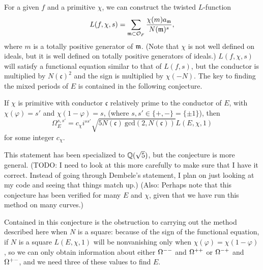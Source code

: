 \documentclass{amsart}
\newcommand{\fc}{\mathfrak{c}}
\newcommand{\OF}{\cO_F}
\begin{document}
For a given $f$ and a primitive $\chi$, we can construct the twisted $L$-function
\[
    L(f, \chi, s) = \sum_{\m \subset \OF} \frac{\chi(m)a{_{\m}}}{N(\m)^s},
\]
where $m$ is a totally positive generator of $\mathfrak{m}$. (Note that $\chi$ is not well defined
on ideals, but it is well defined on totally positive generators of ideals.) $L(f, \chi, s)$
will satisfy a functional equation similar to that of $L(f, s)$, but the conductor is
multiplied by $N(\fc)^2$ and the sign is multiplied by $\chi(-N)$. The key to finding the
mixed periods of $E$ is contained in the following conjecture.
\begin{conjecture}[REFERENCE]
If $\chi$ is primitive with conductor $\fc$ relatively prime to the
conductor of $E$, with $\chi(\varphi) = s'$ and
$\chi(1 - \varphi) = s$, (where $s, s' \in \{+, -\} = \{\pm1\}$), then
\[
    \Omega^{s,s'}_E = c_\chi i^{ss'} \sqrt{5 N(\fc)\ \mathrm{gcd}(2, N(\fc))} L(E, \chi, 1)
\]
for some integer $c_\chi$. 
\end{conjecture}
\begin{remark}
This statement has been specialized to $\mathbb{Q}(\sqrt 5)$, but the conjecture is more general.
(TODO: I need to look at this more carefully to make sure that I have it correct. Instead
of going through Dembele's statement, I plan on just looking at my code and seeing that
things match up.) (Also: Perhaps note that this conjecture has been verified for many $E$
and $\chi$, given that we have run this method on many curves.)
\end{remark}

\begin{remark}
Contained in this conjecture is the obstruction to carrying out the method described here when 
$N$ is a square: because of the sign of the functional equation, if $N$ is a square $L(E, \chi, 1)$
will be nonvanishing only when $\chi(\varphi) = \chi(1 - \varphi)$, so we can only obtain
information about either $\Omega^{--}$ and $\Omega^{++}$ or $\Omega^{-+}$ and $\Omega^{+-}$, and we need
three of these values to find $E$.
\end{remark}
\end{document}
